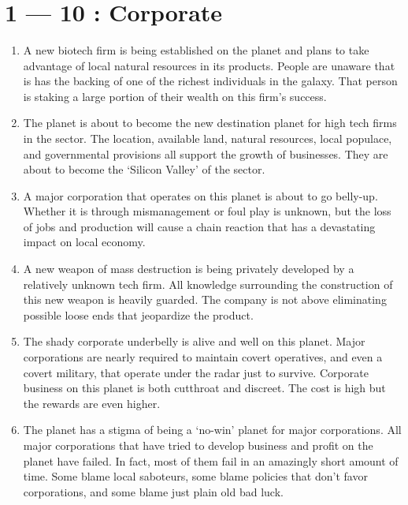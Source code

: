 \documentclass{article}
\begin{document}
\title{\vspace{-0.5cm}{\Huge Star Wars World Secrets} \vspace{-1cm}}

\date{}

\maketitle

\section*{1 --- 10 : Corporate}
\begin{enumerate}
	\item A new biotech firm is being established on the planet and plans to take advantage of local natural resources in its products. People are unaware that is has the backing of one of the richest individuals in the galaxy. That person is staking a large portion of their wealth on this firm’s success.
	\item The planet is about to become the new destination planet for high tech firms in the sector. The location, available land, natural resources, local populace, and governmental provisions all support the growth of businesses. They are about to become the ‘Silicon Valley’ of the sector.
	\item A major corporation that operates on this planet is about to go belly-up. Whether it is through mismanagement or foul play is unknown, but the loss of jobs and production will cause a chain reaction that has a devastating impact on local economy.
	\item A new weapon of mass destruction is being privately developed by a relatively unknown tech firm. All knowledge surrounding the construction of this new weapon is heavily guarded. The company is not above eliminating possible loose ends that jeopardize the product.
	\item The shady corporate underbelly is alive and well on this planet. Major corporations are nearly required to maintain covert operatives, and even a covert military, that operate under the radar just to survive. Corporate business on this planet is both cutthroat and discreet. The cost is high but the rewards are even higher.
	\item The planet has a stigma of being a ‘no-win’ planet for major corporations. All major corporations that have tried to develop business and profit on the planet have failed. In fact, most of them fail in an amazingly short amount of time. Some blame local saboteurs, some blame policies that don’t favor corporations, and some blame just plain old bad luck.

\end{enumerate}
\end{document}
